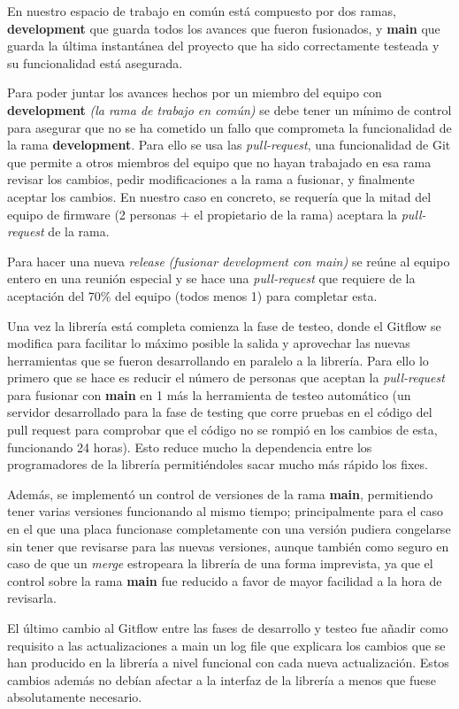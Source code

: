 \documentclass{report}
\begin{document}
En nuestro espacio de trabajo en común está compuesto por dos ramas, \textbf{development} que guarda todos los avances que fueron fusionados, y \textbf{main} que guarda la última instantánea del proyecto que ha sido correctamente testeada y su funcionalidad está asegurada. \par
Para poder juntar los avances hechos por un miembro del equipo con \textbf{development} \textit{(la rama de trabajo en común)} se debe tener un mínimo de control para asegurar que no se ha cometido un fallo que comprometa la funcionalidad de la rama \textbf{development}. Para ello se usa las \textit{pull-request}, una funcionalidad de Git que permite a otros miembros del equipo que no hayan trabajado en esa rama revisar los cambios, pedir modificaciones a la rama a fusionar, y finalmente aceptar los cambios. En nuestro caso en concreto, se requería que la mitad del equipo de firmware (2 personas + el propietario de la rama) aceptara la \textit{pull-request} de la rama. \par
Para hacer una nueva \textit{release} \textit{(fusionar development con main)} se reúne al equipo entero en una reunión especial y se hace una \textit{pull-request} que requiere de la aceptación del 70\% del equipo (todos menos 1) para completar esta. 
\par \vspace{0.3 cm}

Una vez la librería está completa comienza la fase de testeo, donde el Gitflow se modifica para facilitar lo máximo posible la salida y aprovechar las nuevas herramientas que se fueron desarrollando en paralelo a la librería. Para ello lo primero que se hace es reducir el número de personas que aceptan la \textit{pull-request} para fusionar con \textbf{main} en 1 más la herramienta de testeo automático (un servidor desarrollado para la fase de testing que corre pruebas en el código del pull request para comprobar que el código no se rompió en los cambios de esta, funcionando 24 horas). Esto reduce mucho la dependencia entre los programadores de la librería permitiéndoles sacar mucho más rápido los fixes. \par
Además, se implementó un control de versiones de la rama \textbf{main}, permitiendo tener varias versiones funcionando al mismo tiempo; principalmente para el caso en el que una placa funcionase completamente con una versión pudiera congelarse sin tener que revisarse para las nuevas versiones, aunque también como seguro en caso de que un \textit{merge} estropeara la librería de una forma imprevista, ya que el control sobre la rama \textbf{main} fue reducido a favor de mayor facilidad a la hora de revisarla. \par
El último cambio al Gitflow entre las fases de desarrollo y testeo fue añadir como requisito a las actualizaciones a main un log file que explicara los cambios que se han producido en la librería a nivel funcional con cada nueva actualización. Estos cambios además no debían afectar a la interfaz de la librería a menos que fuese absolutamente necesario. 
\par \vspace{0.3 cm}
\end{document}
